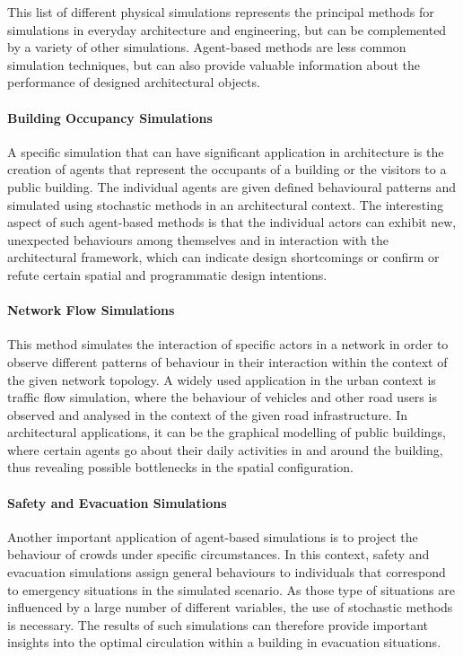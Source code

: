 \documentclass[a4paper, 12pt]{report}
\begin{document}
This list of different physical simulations represents the principal methods for simulations in everyday architecture and engineering, but can be complemented by a variety of other simulations. Agent-based methods are less common simulation techniques, but can also provide valuable information about the performance of designed architectural objects.

\paragraph{Building Occupancy Simulations}\label{par:building-occupancy-simulations}

A specific simulation that can have significant application in architecture is the creation of agents that represent the occupants of a building or the visitors to a public building. The individual agents are given defined behavioural patterns and simulated using \gls{stochastic} methods in an architectural context. The interesting aspect of such agent-based methods is that the individual actors can exhibit new, unexpected behaviours among themselves and in interaction with the architectural framework, which can indicate design shortcomings or confirm or refute certain spatial and programmatic design intentions.

\paragraph{Network Flow Simulations}\label{par:network-flow-simulations}

This method simulates the interaction of specific actors in a network in order to observe different patterns of behaviour in their interaction within the context of the given network topology. A widely used application in the urban context is traffic flow simulation, where the behaviour of vehicles and other road users is observed and analysed in the context of the given road infrastructure. In architectural applications, it can be the graphical modelling of public buildings, where certain agents go about their daily activities in and around the building, thus revealing possible bottlenecks in the spatial configuration.

\paragraph{Safety and Evacuation Simulations}\label{par:safety-and-evacuation-simulations}

Another important application of agent-based simulations is to project the behaviour of crowds under specific circumstances. In this context, safety and evacuation simulations assign general behaviours to individuals that correspond to emergency situations in the simulated scenario. As those type of situations are influenced by a large number of different variables, the use of \gls{stochastic} methods is necessary. The results of such simulations can therefore provide important insights into the optimal circulation within a building in evacuation situations.
\end{document}
